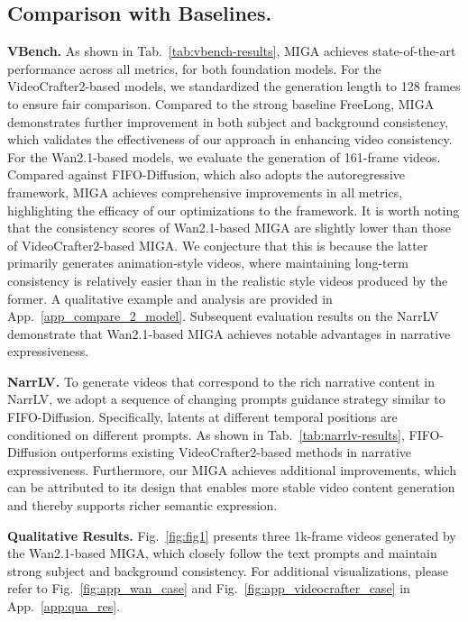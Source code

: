 \documentclass{llmxive}
\begin{document}
\subsection{Comparison with Baselines.}
\label{sota_compare}
\textbf{VBench.}
As shown in Tab.~\ref{tab:vbench-results}, MIGA achieves state-of-the-art performance across all metrics, for both foundation models.
For the VideoCrafter2-based models, we standardized the generation length to 128 frames to ensure fair comparison. Compared to the strong baseline FreeLong, MIGA demonstrates further improvement in both subject and background consistency, which validates the effectiveness of our approach in enhancing video consistency.
For the Wan2.1-based models, we evaluate the generation of 161-frame videos.
Compared against FIFO-Diffusion, which also adopts the autoregressive framework, MIGA achieves comprehensive improvements in all metrics, highlighting the efficacy of our optimizations to the framework.
It is worth noting that the consistency scores of Wan2.1-based MIGA are slightly lower than those of VideoCrafter2-based MIGA. 
We conjecture that this is because the latter primarily generates animation-style videos, where maintaining long-term consistency is relatively easier than in the realistic style videos produced by the former.
A qualitative example and analysis are provided in App.~\ref{app_compare_2_model}.
Subsequent evaluation results on the NarrLV demonstrate that Wan2.1-based MIGA achieves notable advantages in narrative expressiveness.


\textbf{NarrLV.} To generate videos that correspond to the rich narrative content in NarrLV, we adopt a sequence of changing prompts guidance strategy similar to FIFO-Diffusion. 
Specifically, latents at different temporal positions are conditioned on different prompts. 
As shown in Tab.~\ref{tab:narrlv-results}, FIFO-Diffusion outperforms existing VideoCrafter2-based methods in narrative expressiveness. Furthermore, our MIGA achieves additional improvements, which can be attributed to its design that enables more stable video content generation and thereby supports richer semantic expression.

\textbf{Qualitative Results.} 
Fig.~\ref{fig:fig1} presents three 1k-frame videos generated by the Wan2.1-based MIGA, which closely follow the text prompts and maintain strong subject and background consistency. For additional visualizations, please refer to Fig.~\ref{fig:app_wan_case} and Fig.~\ref{fig:app_videocrafter_case} in App.~\ref{app:qua_res}.
\end{document}
